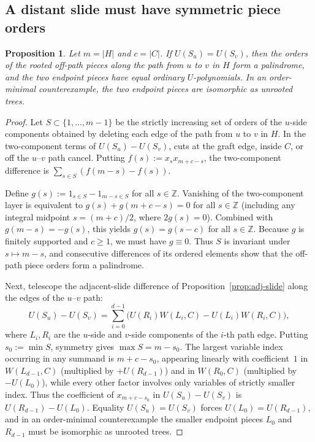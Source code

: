 \documentclass[10pt]{article}
\newtheorem{proposition}[theorem]{Proposition}
\begin{document}
\subsection{A distant slide must have symmetric piece orders}

\begin{proposition}\label{prop:distant-slide}
Let $m=|H|$ and $c=|C|$. If $U(S_u)=U(S_v)$, then the orders of the rooted off-path pieces along the path from $u$ to $v$ in $H$ form a palindrome, and the two endpoint pieces have equal ordinary $U$-polynomials. In an order-minimal counterexample, the two endpoint pieces are isomorphic as unrooted trees.
\end{proposition}

\begin{proof}
Let $S\subset\{1,\ldots,m-1\}$ be the strictly increasing set of orders of the $u$-side components obtained by deleting each edge of the path from $u$ to $v$ in $H$. In the two-component terms of $U(S_u)-U(S_v)$, cuts at the graft edge, inside $C$, or off the $u$--$v$ path cancel. Putting $f(s) := x_s x_{m+c-s}$, the two-component difference is $\sum_{s\in S}(f(m-s)-f(s))$.

Define $g(s) := 1_{s\in S} - 1_{m-s\in S}$ for all $s\in\mathbb{Z}$. Vanishing of the two-component layer is equivalent to $g(s)+g(m+c-s)=0$ for all $s\in\mathbb{Z}$ (including any integral midpoint $s=(m+c)/2$, where $2g(s)=0$). Combined with $g(m-s)=-g(s)$, this yields $g(s)=g(s-c)$ for all $s\in\mathbb{Z}$. Because $g$ is finitely supported and $c\ge 1$, we must have $g\equiv 0$. Thus $S$ is invariant under $s\mapsto m-s$, and consecutive differences of its ordered elements show that the off-path piece orders form a palindrome.

Next, telescope the adjacent-slide difference of Proposition~\ref{prop:adj-slide} along the edges of the $u$--$v$ path:
\[
U(S_u) - U(S_v) = \sum_{i=0}^{d-1} \bigl(U(R_i)W(L_i,C) - U(L_i)W(R_i,C)\bigr),
\]
where $L_i,R_i$ are the $u$-side and $v$-side components of the $i$-th path edge. Putting $s_0 := \min S$, symmetry gives $\max S = m-s_0$. The largest variable index occurring in any summand is $m+c-s_0$, appearing linearly with coefficient~$1$ in $W(L_{d-1},C)$ (multiplied by $+U(R_{d-1})$) and in $W(R_0,C)$ (multiplied by $-U(L_0)$), while every other factor involves only variables of strictly smaller index. Thus the coefficient of $x_{m+c-s_0}$ in $U(S_u)-U(S_v)$ is $U(R_{d-1})-U(L_0)$. Equality $U(S_u)=U(S_v)$ forces $U(L_0)=U(R_{d-1})$, and in an order-minimal counterexample the smaller endpoint pieces $L_0$ and $R_{d-1}$ must be isomorphic as unrooted trees.
\end{proof}
\end{document}

